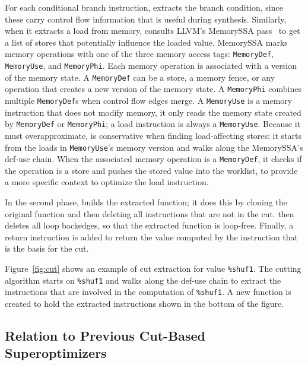 For each conditional branch instruction, \minotaur{} extracts the branch
condition, since these carry control flow information that is useful
during synthesis.
%
Similarly, when it extracts a load from memory, \minotaur{} consults
LLVM's MemorySSA pass~\cite{MemorySSA} to get a list of stores that
potentially influence the loaded value.
%
MemorySSA marks memory operations with one of the three memory access tags:
\texttt{MemoryDef}, \texttt{MemoryUse}, and \texttt{MemoryPhi}.
Each memory operation is associated with a version of the memory state.
%
A \texttt{MemoryDef} can be a store, a memory fence, or any operation
that creates a new version of the memory state.
%
A \texttt{MemoryPhi} combines multiple \texttt{MemoryDef}s when
control flow edges merge.
%
A \texttt{MemoryUse} is a memory instruction that does not modify
memory, it only reads the memory state created by \texttt{MemoryDef}
or \texttt{MemoryPhi}; a load instruction is always a
\texttt{MemoryUse}.
%
Because it must overapproximate, \minotaur{} is conservative when finding
load-affecting stores: it starts from the loads
in \texttt{MemoryUse}'s memory version and walks along the MemorySSA's
def-use chain.
%
When the associated memory operation is a \texttt{MemoryDef}, it
checks if the operation is a store and pushes the stored value into
the worklist, to provide \minotaur{} a more specific context to optimize
the load instruction.


In the second phase, \minotaur{} builds the extracted function; it does
this by cloning the original function and then deleting all
instructions that are not in the cut.
%
\minotaur{} then deletes all loop backedges, so that the extracted
function is loop-free.
%
Finally, a return instruction is added to return the value computed by
the instruction that is the basis for the cut.



Figure~\ref{fig:cut} shows an example of cut extraction
for value \texttt{\%shuf1}.
%
The cutting algorithm starts on \texttt{\%shuf1} and walks along the
def-use chain to extract the instructions that are involved in the
computation of \texttt{\%shuf1}.
%
A new function is created to hold the extracted instructions shown
in the bottom of the figure.



\subsection{Relation to Previous Cut-Based Superoptimizers}

